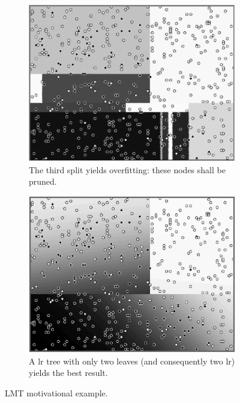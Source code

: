 \begin{figure}[!htb]
\begin{center}
\centering
\begin{subfigure}[t]{0.32\textwidth}
\centering
\includegraphics[width=\textwidth]{figures/chapitre6/lmt_tree_3.png}
\caption{\label{fig:lmt4} The third split yields overfitting: these nodes shall be pruned.}
\end{subfigure}%
\hspace*{1cm} \begin{subfigure}[t]{0.32\textwidth}
\centering
\includegraphics[width=\textwidth]{figures/chapitre6/lmt_logistic.png}
\caption{\label{fig:lmt5} A \gls{lr} tree with only two leaves (and consequently two \gls{lr}) yields the best result.}
\end{subfigure}
\end{center}

\caption{\label{fig:lmt} LMT motivational example.}
\end{figure}




